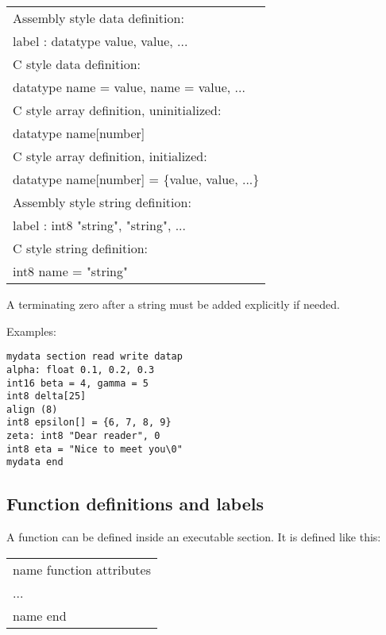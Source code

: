 \documentclass[forwardcom.tex]{subfiles}
\begin{document}
\begin{tabular}{|p{140mm}|}
\hline
Assembly style data definition:\\
\hspace{4mm} label : datatype value, value, ...\\
C style data definition:\\
\hspace{4mm} datatype name = value, name = value, ...\\
C style array definition, uninitialized:\\
\hspace{4mm} datatype name[number]\\
C style array definition, initialized:\\
\hspace{4mm} datatype name[number] = \{value, value, ...\}\\
Assembly style string definition:\\
\hspace{4mm} label : int8 "string", "string", ...\\
C style string definition:\\
\hspace{4mm} int8 name = "string" \\
\hline
\end{tabular}
\vv

A terminating zero after a string must be added explicitly if needed.
\vv

Examples:
\vspace{1mm}

\begin{lstlisting}[frame=single, showstringspaces=false]
mydata section read write datap
alpha: float 0.1, 0.2, 0.3
int16 beta = 4, gamma = 5
int8 delta[25]
align (8)
int8 epsilon[] = {6, 7, 8, 9}
zeta: int8 "Dear reader", 0
int8 eta = "Nice to meet you\0"
mydata end
\end{lstlisting}
\vv


\subsection{Function definitions and labels} \label{assemblyFunctionDef}
A function can be defined inside an executable section. It is defined like this:
\vspace{1mm}

\begin{tabular}{|p{140mm}|}
\hline
\hspace{4mm} name function attributes\\
\hspace{4mm} ...\\
\hspace{4mm} name end\\
\hline
\end{tabular}
\vspace{4mm}
\end{document}
